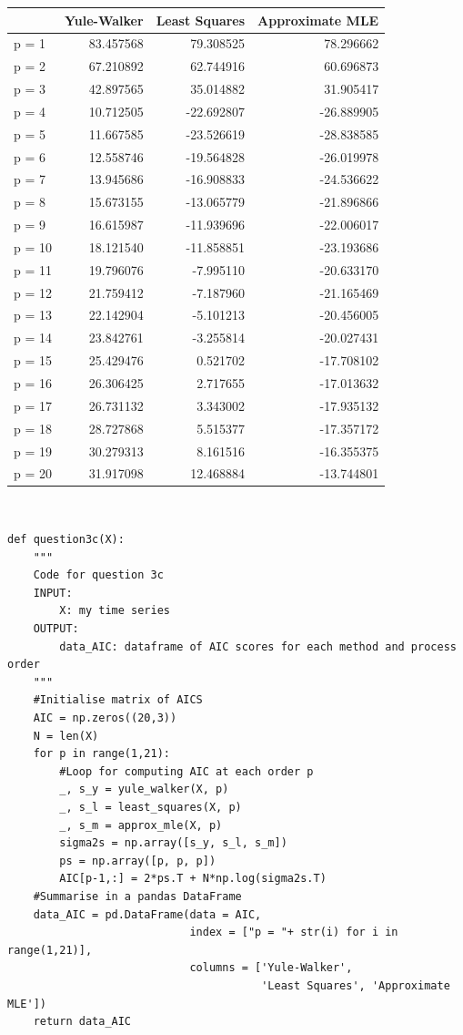 \documentclass[a4paper,10pt]{article}
\theoremstyle{mytheor}
\begin{document}
\begin{tabular}{lrrr}
\toprule
{} &  Yule-Walker &  Least Squares &  Approximate MLE \\
\midrule
p = 1  &    83.457568 &      79.308525 &        78.296662 \\
p = 2  &    67.210892 &      62.744916 &        60.696873 \\
p = 3  &    42.897565 &      35.014882 &        31.905417 \\
p = 4  &    10.712505 &     -22.692807 &       -26.889905 \\
p = 5  &    11.667585 &     -23.526619 &       -28.838585 \\
p = 6  &    12.558746 &     -19.564828 &       -26.019978 \\
p = 7  &    13.945686 &     -16.908833 &       -24.536622 \\
p = 8  &    15.673155 &     -13.065779 &       -21.896866 \\
p = 9  &    16.615987 &     -11.939696 &       -22.006017 \\
p = 10 &    18.121540 &     -11.858851 &       -23.193686 \\
p = 11 &    19.796076 &      -7.995110 &       -20.633170 \\
p = 12 &    21.759412 &      -7.187960 &       -21.165469 \\
p = 13 &    22.142904 &      -5.101213 &       -20.456005 \\
p = 14 &    23.842761 &      -3.255814 &       -20.027431 \\
p = 15 &    25.429476 &       0.521702 &       -17.708102 \\
p = 16 &    26.306425 &       2.717655 &       -17.013632 \\
p = 17 &    26.731132 &       3.343002 &       -17.935132 \\
p = 18 &    28.727868 &       5.515377 &       -17.357172 \\
p = 19 &    30.279313 &       8.161516 &       -16.355375 \\
p = 20 &    31.917098 &      12.468884 &       -13.744801 \\
\bottomrule
\end{tabular} \\

\begin{lstlisting}
def question3c(X):
    """
    Code for question 3c
    INPUT:
        X: my time series
    OUTPUT:
        data_AIC: dataframe of AIC scores for each method and process order
    """
    #Initialise matrix of AICS
    AIC = np.zeros((20,3))
    N = len(X)
    for p in range(1,21):
        #Loop for computing AIC at each order p
        _, s_y = yule_walker(X, p)
        _, s_l = least_squares(X, p)
        _, s_m = approx_mle(X, p)
        sigma2s = np.array([s_y, s_l, s_m])
        ps = np.array([p, p, p])
        AIC[p-1,:] = 2*ps.T + N*np.log(sigma2s.T)
    #Summarise in a pandas DataFrame
    data_AIC = pd.DataFrame(data = AIC, 
                            index = ["p = "+ str(i) for i in range(1,21)],
                            columns = ['Yule-Walker', 
                                       'Least Squares', 'Approximate MLE'])
    return data_AIC
\end{lstlisting}
\end{document}
